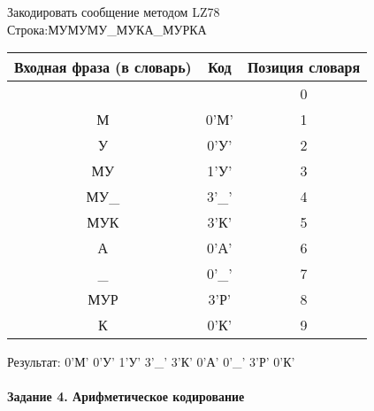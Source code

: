 \documentclass[a4paper, 12pt]{article}
\begin{document}
Закодировать сообщение методом LZ78\\
Строка:МУМУМУ\_МУКА\_МУРКА\\
\begin{table}[h!]
\centering
\begin{tabular}{|c|c|c|} 
\hline
 Входная фраза (в словарь) & Код & Позиция словаря \\ \hline

 &  & 0 \\ \hline
М & 0'М' & 1 \\ \hline
У & 0'У' & 2 \\ \hline
МУ & 1'У' & 3 \\ \hline
МУ\_ & 3'\_' & 4 \\ \hline
МУК & 3'К' & 5 \\ \hline
А & 0'А' & 6 \\ \hline
\_ & 0'\_' & 7 \\ \hline
МУР & 3'Р' & 8 \\ \hline
К & 0'К' & 9 \\ \hline
\end{tabular}
\end{table}

Результат: 0'М' 0'У' 1'У' 3'\_' 3'К' 0'А' 0'\_' 3'Р' 0'К'\\
\pagebreak
\paragraph{Задание 4. Арифметическое кодирование\\}
\end{document}
